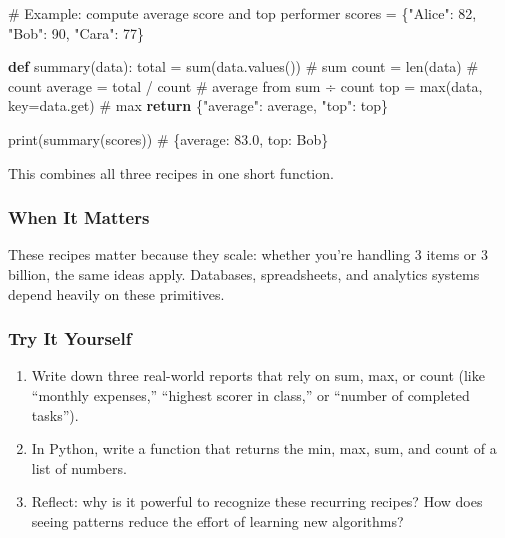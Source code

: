\documentclass[
  letterpaper,
  DIV=11,
  numbers=noendperiod]{scrreprt}
\newenvironment{Shaded}{\begin{snugshade}}{\end{snugshade}}
\newcommand{\BuiltInTok}[1]{\textcolor[rgb]{0.00,0.23,0.31}{#1}}
\newcommand{\CommentTok}[1]{\textcolor[rgb]{0.37,0.37,0.37}{#1}}
\newcommand{\ControlFlowTok}[1]{\textcolor[rgb]{0.00,0.23,0.31}{\textbf{#1}}}
\newcommand{\DecValTok}[1]{\textcolor[rgb]{0.68,0.00,0.00}{#1}}
\newcommand{\KeywordTok}[1]{\textcolor[rgb]{0.00,0.23,0.31}{\textbf{#1}}}
\newcommand{\NormalTok}[1]{\textcolor[rgb]{0.00,0.23,0.31}{#1}}
\newcommand{\OperatorTok}[1]{\textcolor[rgb]{0.37,0.37,0.37}{#1}}
\newcommand{\StringTok}[1]{\textcolor[rgb]{0.13,0.47,0.30}{#1}}
\providecommand{\tightlist}{%
  \setlength{\itemsep}{0pt}\setlength{\parskip}{0pt}}
\begin{document}
\begin{Shaded}
\begin{Highlighting}[]
\CommentTok{\# Example: compute average score and top performer}
\NormalTok{scores }\OperatorTok{=}\NormalTok{ \{}\StringTok{"Alice"}\NormalTok{: }\DecValTok{82}\NormalTok{, }\StringTok{"Bob"}\NormalTok{: }\DecValTok{90}\NormalTok{, }\StringTok{"Cara"}\NormalTok{: }\DecValTok{77}\NormalTok{\}}

\KeywordTok{def}\NormalTok{ summary(data):}
\NormalTok{    total }\OperatorTok{=} \BuiltInTok{sum}\NormalTok{(data.values())             }\CommentTok{\# sum}
\NormalTok{    count }\OperatorTok{=} \BuiltInTok{len}\NormalTok{(data)                      }\CommentTok{\# count}
\NormalTok{    average }\OperatorTok{=}\NormalTok{ total }\OperatorTok{/}\NormalTok{ count                }\CommentTok{\# average from sum ÷ count}
\NormalTok{    top }\OperatorTok{=} \BuiltInTok{max}\NormalTok{(data, key}\OperatorTok{=}\NormalTok{data.get)          }\CommentTok{\# max}
    \ControlFlowTok{return}\NormalTok{ \{}\StringTok{"average"}\NormalTok{: average, }\StringTok{"top"}\NormalTok{: top\}}

\BuiltInTok{print}\NormalTok{(summary(scores))  }\CommentTok{\# \{\textquotesingle{}average\textquotesingle{}: 83.0, \textquotesingle{}top\textquotesingle{}: \textquotesingle{}Bob\textquotesingle{}\}}
\end{Highlighting}
\end{Shaded}

This combines all three recipes in one short function.

\subsubsection{When It Matters}\label{when-it-matters-97}

These recipes matter because they scale: whether you're handling 3 items
or 3 billion, the same ideas apply. Databases, spreadsheets, and
analytics systems depend heavily on these primitives.

\subsubsection{Try It Yourself}\label{try-it-yourself-99}

\begin{enumerate}
\def\labelenumi{\arabic{enumi}.}
\tightlist
\item
  Write down three real-world reports that rely on sum, max, or count
  (like ``monthly expenses,'' ``highest scorer in class,'' or ``number
  of completed tasks'').
\item
  In Python, write a function that returns the min, max, sum, and count
  of a list of numbers.
\item
  Reflect: why is it powerful to recognize these recurring recipes? How
  does seeing patterns reduce the effort of learning new algorithms?
\end{enumerate}
\end{document}
